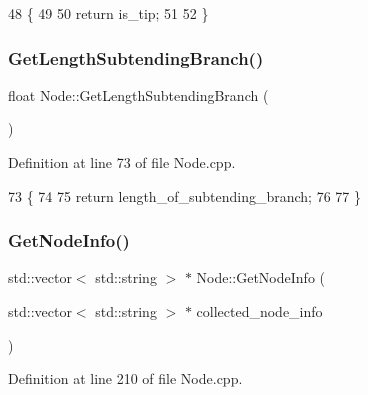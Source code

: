 \begin{DoxyCode}
48                    \{
49   
50   \textcolor{keywordflow}{return} is\_tip;
51   
52 \}
\end{DoxyCode}
\mbox{\label{classNode_a7e55b2011625f394b8b08310b8cf45dc}} 
\subsubsection{\texorpdfstring{Get\+Length\+Subtending\+Branch()}{GetLengthSubtendingBranch()}}
{\footnotesize\ttfamily float Node\+::\+Get\+Length\+Subtending\+Branch (\begin{DoxyParamCaption}{ }\end{DoxyParamCaption})}



Definition at line 73 of file Node.\+cpp.


\begin{DoxyCode}
73                                       \{
74   
75   \textcolor{keywordflow}{return} length\_of\_subtending\_branch;
76   
77 \}
\end{DoxyCode}
\mbox{\label{classNode_aeb57ef43b22fa37c2855ebb07e4e7331}} 
\subsubsection{\texorpdfstring{Get\+Node\+Info()}{GetNodeInfo()}}
{\footnotesize\ttfamily std\+::vector$<$ std\+::string $>$ $\ast$ Node\+::\+Get\+Node\+Info (\begin{DoxyParamCaption}\item[{std\+::vector$<$ std\+::string $>$ $\ast$}]{collected\+\_\+node\+\_\+info }\end{DoxyParamCaption})}



Definition at line 210 of file Node.\+cpp.


